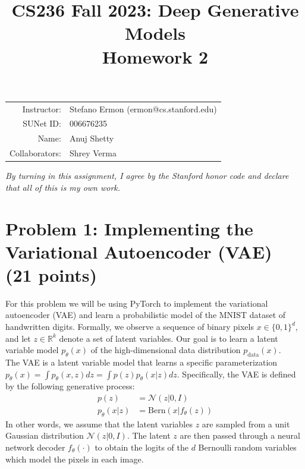\documentclass{article}
\title{\textbf{CS236 Fall 2023: Deep Generative Models} \\Homework 2}
\date{}
\theoremstyle{case}
\theoremstyle{definition}
\begin{document}
\maketitle

\begin{center}
\begin{tabular}{rl}
Instructor: & Stefano Ermon (ermon@cs.stanford.edu)\\
SUNet ID: & 006676235 \\
Name:  & Anuj Shetty \\Collaborators: & Shrey Verma
\end{tabular}
\end{center}

\textit{By turning in this assignment, I agree by the Stanford honor code and declare
that all of this is my own work.} \\

\section*{Problem 1: Implementing the Variational Autoencoder (VAE) (21 points)}
For this problem we will be using PyTorch to implement the variational autoencoder (VAE) and learn a probabilistic model of the MNIST dataset of handwritten digits. Formally, we observe a sequence of binary pixels \( x \in \{0, 1\}^d \), and let \( z \in \mathbb{R}^k \) denote a set of latent variables. Our goal is to learn a latent variable model \( p_\theta(x) \) of the high-dimensional data distribution \( p_{\text{data}}(x) \).\\


The VAE is a latent variable model that learns a specific parameterization $p_\theta(x) = \int p_\theta(x, z)dz = \int p(z)p_\theta (x|z)dz$. Specifically, the VAE is defined by the following generative process:
\begin{align*}
p(z) &= \mathcal{N}(z|0, I) \\
p_\theta(x|z) &= \text{Bern}(x|f_\theta(z))
\end{align*}
In other words, we assume that the latent variables $z$ are sampled from a unit Gaussian distribution $\mathcal{N}(z|0, I)$. The latent $z$ are then passed through a neural network decoder $f_\theta(\cdot)$ to obtain the logits of the $d$ Bernoulli random variables which model the pixels in each image.\\
\end{document}
